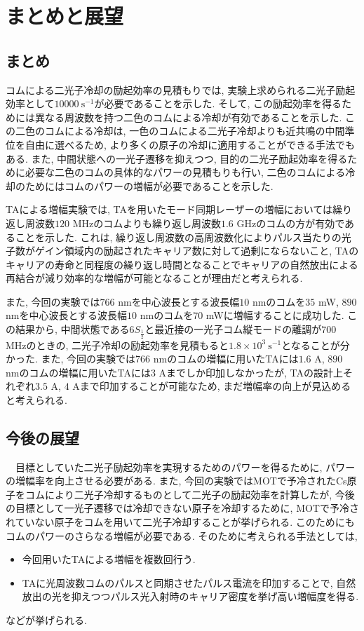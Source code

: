 \documentclass[uplatex, dvipdfmx, a4paper, report, papersize, 11pt]{jsbook}
\begin{document}
\chapter{まとめと展望}
\section{まとめ}
コムによる二光子冷却の励起効率の見積もりでは, 実験上求められる二光子励起効率として$10000\ \mathrm{s^{-1}}$が必要であることを示した. そして, この励起効率を得るためには異なる周波数を持つ二色のコムによる冷却が有効であることを示した. この二色のコムによる冷却は, 一色のコムによる二光子冷却よりも近共鳴の中間準位を自由に選べるため, より多くの原子の冷却に適用することができる手法でもある. また, 中間状態への一光子遷移を抑えつつ, 目的の二光子励起効率を得るために必要な二色のコムの具体的なパワーの見積もりも行い, 二色のコムによる冷却のためにはコムのパワーの増幅が必要であることを示した. \par
TAによる増幅実験では, TAを用いたモード同期レーザーの増幅においては繰り返し周波数$120$ MHzのコムよりも繰り返し周波数$1.6$ GHzのコムの方が有効であることを示した. これは, 繰り返し周波数の高周波数化によりパルス当たりの光子数がゲイン領域内の励起されたキャリア数に対して過剰にならないこと, TAのキャリアの寿命と同程度の繰り返し時間となることでキャリアの自然放出による再結合が減り効率的な増幅が可能となることが理由だと考えられる. \par
また, 今回の実験では$766$ nmを中心波長とする波長幅$10$ nmのコムを$35$ mW, $890$ nmを中心波長とする波長幅$10$ nmのコムを$70$ mWに増幅することに成功した. この結果から, 中間状態である$6S_{\frac{1}{2}}$と最近接の一光子コム縦モードの離調が$700$ MHzのときの, 二光子冷却の励起効率を見積もると$1.8\times10^3\ \mathrm{s^{-1}}$となることが分かった. また, 今回の実験では$766$ nmのコムの増幅に用いたTAには$1.6$ A, $890$ nmのコムの増幅に用いたTAには$3$ Aまでしか印加しなかったが, TAの設計上それぞれ$3.5$ A, $4$ Aまで印加することが可能なため, まだ増幅率の向上が見込めると考えられる. \par

\section{今後の展望}
　目標としていた二光子励起効率を実現するためのパワーを得るために, パワーの増幅率を向上させる必要がある. また, 今回の実験ではMOTで予冷されたCs原子をコムにより二光子冷却するものとして二光子の励起効率を計算したが, 今後の目標として一光子遷移では冷却できない原子を冷却するために, MOTで予冷されていない原子をコムを用いて二光子冷却することが挙げられる. このためにもコムのパワーのさらなる増幅が必要である. そのために考えられる手法としては,
\begin{itemize}
  \item 今回用いたTAによる増幅を複数回行う.
  \item TAに光周波数コムのパルスと同期させたパルス電流を印加することで, 自然放出の光を抑えつつパルス光入射時のキャリア密度を挙げ高い増幅度を得る.
\end{itemize}
などが挙げられる.

\end{document}
